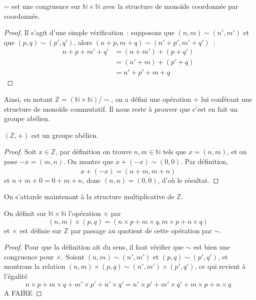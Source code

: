 \begin{proposition}
  $\sim$ est une congruence sur $\mathbb N \times \mathbb N$ avec la structure
  de monoïde coordonnée par coordonnée.
\end{proposition}

\begin{proof}
  Il s'agit d'une simple vérification~: supposons que $(n,m)\sim(n',m')$ et que
  $(p,q)\sim(p',q')$, alors $(n+p,m+q)\sim(n'+p',m'+q')$~:
  \begin{align*}
    n + p + m' + q' &= (n + m') + (p + q')\\
    &= (n' + m) + (p' + q)\\
    &= n' + p' + m + q
  \end{align*}
\end{proof}

Ainsi, en notant $\mathbb Z = (\mathbb N \times \mathbb N) / \sim$, on a
défini une opération $+$ lui conférant une structure de monoïde commutatif. Il
nous reste à prouver que c'est en fait un groupe abélien.

\begin{proposition}
  $(\mathbb Z,+)$ est un groupe abélien.
\end{proposition}

\begin{proof}
  Soit $x \in \mathbb Z$, par définition on trouve $n,m\in\mathbb N$ tels que
  $x = \overline{(n,m)}$, et on pose $-x = \overline{(m,n)}$. On montre que
  $x + (-x) \sim (0,0)$. Par définition,
  \[x + (-x) = \overline{(n + m, m + n)}\]
  et $n + m + 0 = 0 + m + n$, donc $\overline{(n,n)}=\overline{(0,0)}$, d'où le
  résultat.
\end{proof}

On s'attarde maintenant à la structure multiplicative de $\mathbb Z$.

\begin{definition}
  On définit sur $\mathbb N\times \mathbb N$ l'opération $\times$ par
  \[(n,m)\times(p,q) = (n\times p + m \times q, m \times p + n \times q)\]
  et $\times$ est définie sur $\mathbb Z$ par passage au quotient de cette
  opération par $\sim$.
\end{definition}

\begin{proof}
  Pour que la définition ait du sens, il faut vérifier que $\sim$ est bien une
  congruence pour $\times$. Soient $(n,m)\sim(n',m')$ et $(p,q)\sim(p',q')$, et
  montrons la relation $(n,m)\times(p,q)\sim(n',m')\times(p',q')$, ce qui
  revient à l'égalité
  \[n\times p + m \times q + m' \times p' + n' \times q' =
  n' \times p' + m' \times q' + m \times p + n \times q\]
  A FAIRE
\end{proof}

